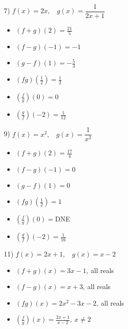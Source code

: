 \documentclass[11pt]{book}
\theoremstyle{definition}  %
\begin{document}
7) $f(x)=2x,~~~~g(x)=\dfrac{1}{2x+1}$ 
\scriptsize
\begin{multicols}{3}
\begin{itemize}
\item  $(f+g)(2)=\frac{21}{5}$
\item  $(f-g)(-1)=-1$
\item  $(g-f)(1)=-\frac{5}{3}$
\end{itemize}
\end{multicols}

\begin{multicols}{3}
\begin{itemize}
\item  $(fg)(\frac{1}{2})=\frac{1}{2}$
\item  $\left(\frac{f}{g}\right)(0)=0$
\item  $\left(\frac{g}{f}\right)(-2)=\frac{1}{12}$
\end{itemize}
\end{multicols}
\normalsize

9) $f(x)=x^2,~~~~g(x)=\dfrac{1}{x^2}$ 
\scriptsize
\begin{multicols}{3}
\begin{itemize}
\item  $(f+g)(2)=\frac{17}{4}$
\item  $(f-g)(-1)=0$
\item  $(g-f)(1)=0$
\end{itemize}
\end{multicols}

\begin{multicols}{3}
\begin{itemize}
\item  $(fg)(\frac{1}{2})=1$
\item  $\left(\frac{f}{g}\right)(0)=$DNE
\item  $\left(\frac{g}{f}\right)(-2)=\frac{1}{16}$
\end{itemize}
\end{multicols}
\normalsize

11) $f(x)=2x+1,~~~~g(x)=x-2$ 
\scriptsize
\begin{multicols}{2}
\begin{itemize}
\item  $(f+g)(x)=3x-1,~$all reals
\item  $(f-g)(x)=x+3,~$all reals
\end{itemize}
\end{multicols}
\begin{multicols}{2}
\begin{itemize}
\item  $(fg)(x)=2x^2-3x-2,~$all reals
\item  $\left(\frac{f}{g}\right)(x)=\frac{2x+1}{x-2},~x\neq 2$
\end{itemize}
\end{multicols}
\normalsize
\end{document}
